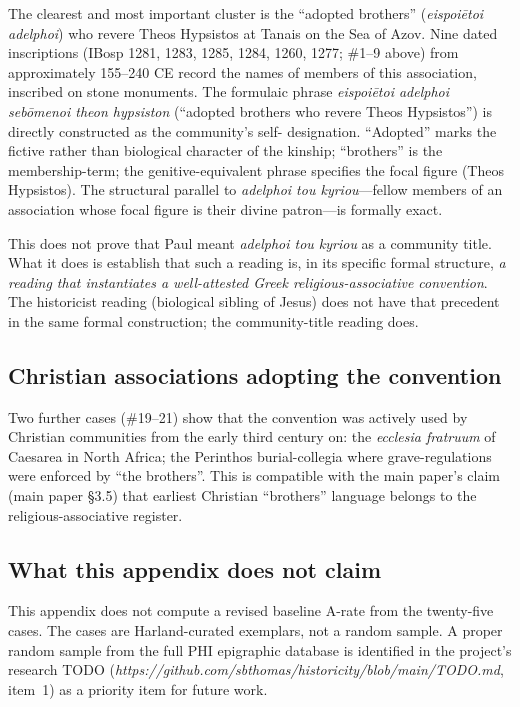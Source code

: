 \documentclass[11pt,oneside]{article}
\begin{document}
The clearest and most important cluster is the ``adopted brothers''
(\textit{eispoi\=etoi adelphoi}) who revere Theos Hypsistos at Tanais
on the Sea of Azov.  Nine dated inscriptions (IBosp 1281, 1283, 1285,
1284, 1260, 1277; \#1--9 above) from approximately 155--240 CE record
the names of members of this association, inscribed on stone
monuments.  The formulaic phrase \textit{eispoi\=etoi adelphoi
seb\=omenoi theon hypsiston} (``adopted brothers who revere Theos
Hypsistos'') is directly constructed as the community's self-
designation.  ``Adopted'' marks the fictive rather than biological
character of the kinship; ``brothers'' is the membership-term; the
genitive-equivalent phrase specifies the focal figure (Theos
Hypsistos).  The structural parallel to \textit{adelphoi tou
kyriou}---fellow members of an association whose focal figure is
their divine patron---is formally exact.

This does not prove that Paul meant \textit{adelphoi tou kyriou} as a
community title.  What it does is establish that such a reading is,
in its specific formal structure, \textit{a reading that instantiates
a well-attested Greek religious-associative convention}.  The
historicist reading (biological sibling of Jesus) does not have that
precedent in the same formal construction; the community-title reading
does.

\subsection*{Christian associations adopting the convention}

Two further cases (\#19--21) show that the convention was actively
used by Christian communities from the early third century on: the
\textit{ecclesia fratruum} of Caesarea in North Africa; the Perinthos
burial-collegia where grave-regulations were enforced by ``the
brothers''.  This is compatible with the main paper's claim
(main paper §3.5) that earliest Christian ``brothers''
language belongs to the religious-associative register.

\subsection*{What this appendix does not claim}

This appendix does not compute a revised baseline A-rate from the
twenty-five cases.  The cases are Harland-curated exemplars, not a
random sample.  A proper random sample from the full PHI epigraphic
database is identified in the project's research TODO
(\textit{https://github.com/sbthomas/historicity/blob/main/TODO.md},
item~1) as a priority item for future work.
\end{document}

